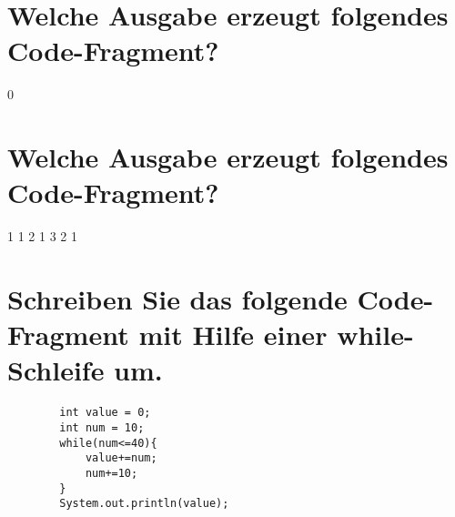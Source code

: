 \documentclass{article}
\begin{document}
    \section{Welche Ausgabe erzeugt folgendes Code-Fragment?}
    0\newline
    \section{Welche Ausgabe erzeugt folgendes Code-Fragment?}
    1 1 2 1 3 2 1\newline
    \section{Schreiben Sie das folgende Code-Fragment mit Hilfe einer while-Schleife um.}
    \begin{verbatim}
        int value = 0;
        int num = 10;
        while(num<=40){
            value+=num;
            num+=10;
        }
        System.out.println(value);
    \end{verbatim}
\end{document}

